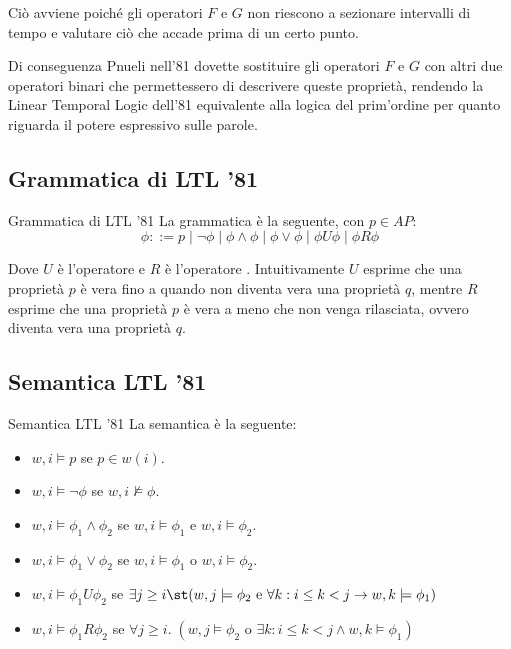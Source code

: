 Ciò avviene poiché gli operatori \(F\) e \(G\) non riescono a sezionare intervalli di tempo e valutare ciò che accade prima di un certo punto.

Di conseguenza Pnueli nell'81 dovette sostituire gli operatori \(F\) e \(G\) con altri due operatori binari che permettessero di descrivere queste proprietà, rendendo la Linear Temporal Logic dell'81 equivalente alla logica del prim'ordine per quanto riguarda il potere espressivo sulle parole.

\subsection{Grammatica di LTL '81}

\begin{definition}{Grammatica di LTL '81}
  La grammatica è la seguente, con \(p \in AP\):
  \[\phi ::= p \mid \neg \phi \mid \phi \land \phi \mid \phi \lor \phi \mid \phi U \phi \mid \phi R\phi\]
\end{definition}
Dove \(U\) è l'operatore  e \(R\) è l'operatore .
Intuitivamente \(U\) esprime che una proprietà \(p\) è vera fino a quando non diventa vera una proprietà \(q\), mentre \(R\) esprime che una proprietà \(p\) è vera a meno che non venga rilasciata, ovvero diventa vera una proprietà \(q\).

\subsection{Semantica LTL '81}

\begin{definition}{Semantica LTL '81}
  La semantica è la seguente:
  \begin{itemize}
    \item \(w,i \models p\) se \(p \in w(i)\).
    \item \(w,i \models \neg\phi\) se \(w,i\not\models\phi\).
    \item \(w,i\models\phi_1 \land \phi_2\) se \(w,i\models\phi_1\) e \(w,i\models\phi_2\).
    \item \(w,i\models\phi_1 \lor \phi_2\) se \(w,i\models\phi_1\) o \(w,i\models\phi_2\).
    \item \(w,i \models \phi_1 U \phi_2\) se \(\exists j \geq i \st (w,j\models \phi_2 \text{ e } \forall k: i \leq k < j \to w,k\models \phi_1)\)
    \item \(w,i \models \phi_1 R\phi_2\) se \(\forall j \geq i.\;( w,j\models \phi_2 \text{ o } \exists k: i \leq k < j \land w,k\models \phi_1)\)
  \end{itemize}
\end{definition}

